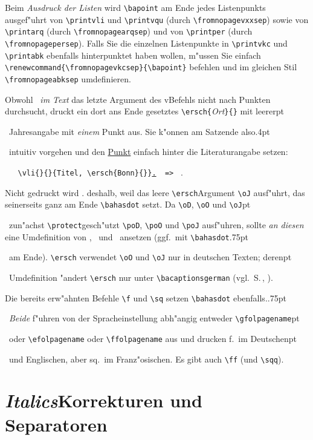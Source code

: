 \documentclass[12pt,a4paper]{article}
\newcommand{\pdfko}[1]{\kern #1pt
                          \strut\ignorespaces}%
\begin{document}
Beim \textit{Ausdruck der Listen} wird \verb|\bapoint| am Ende jedes Listenpunkts
ausgef"uhrt von \verb|\printvli| und \verb|\printvqu| 
(durch \verb|\fromnopagevxxsep|) sowie von \verb|\printarq| 
(durch \verb|\fromnopagearqsep|) und von
\verb|\printper| (durch \verb|\fromnopagepersep|). Falls Sie die
einzelnen Listenpunkte in \verb|\printvkc| und \verb|\printabk| ebenfalls 
hinterpunktet haben wollen, m"ussen Sie einfach 
\verb|\renewcommand{\fromnopagevkcsep}{\bapoint}| befehlen 
und im gleichen Stil \verb|\fromnopageabksep| umdefinieren.


\vspace{1.5ex}\noindent
Obwohl \BibArts\ \textit{im Text} das letzte Argument des v\fhy Befehls nicht 
nach Punkten durchsucht, druckt ein dort ans Ende gesetztes 
\verb|\ersch{|\textit{Ort}\verb|}{}| mit leerer\pdfko{1}\ 
Jahresangabe  mit \textit{einem} Punkt aus. Sie k"onnen am 
Satzende also\pdfko{.4}\  
intuitiv vorgehen und den \underline{Punkt\kern-1.5pt} einfach 
hinter die Literaturangabe setzen:

\vspace{.5ex}\noindent
{\small
 \verb|   \vli{}{}{Titel, \ersch{Bonn}{}}|\underline{\texttt{.}}\verb|  => | 
 .}

\vspace{.5ex}\noindent
Nicht gedruckt wird \oJ. deshalb, weil das leere \verb|\ersch|\hy Argument 
\verb|\oJ| ausf"uhrt, das seinerseits ganz am 
Ende \verb|\bahasdot| setzt. Da \verb|\oD|, \verb|\oO| und \verb|\oJ|\pdfko{1.25}\
zun"achst \verb|\protect|\hy gesch"utzt \verb|\poD|, \verb|\poO| und \verb|\poJ|
ausf"uhren, sollte \textit{an diesen} eine \label{poJ}
Umdefinition von \oD, \oO\ und \oJ\ ansetzen
(ggf.\ mit \verb|\bahasdot|\pdfko{.75}\ 
am Ende). \verb|\ersch| verwendet \verb|\oO| 
und \verb|\oJ| nur in deutschen Texten; deren\pdfko{1}\  
Umdefinition "andert \verb|\ersch| nur unter 
\verb|\bacaptionsgerman| (vgl.\ S.\,\pageref{SprachSep}, \pageref{gerschnoyearname}). 

Die bereits erw"ahnten Befehle \verb|\f| und \verb|\sq| setzen
\verb|\bahasdot| ebenfalls.\pdfko{.75}\ 
\textit{Beide} f"uhren von
der Spracheinstellung abh"angig entweder \verb|\gfolpagename|\pdfko{1.25}\ 
oder \verb|\efolpagename| oder \verb|\ffolpagename| aus und 
drucken f.\ im Deutschen\pdfko{1}\ 
und Englischen, aber sq.\ im Franz"osischen.
Es gibt auch \verb|\ff| (und \verb|\sqq|).



\newpage
\section{\textit{Italics}\hy Korrekturen und Separatoren}%
\label{schraegkap}\label{Sect11}
\end{document}
